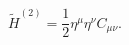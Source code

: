 \begin{equation}
  \tilde{H}^{(2)} = \frac{1}{2} \eta^\mu \eta^\nu C_{\mu\nu}.
  \label{a32}
  \end{equation}

